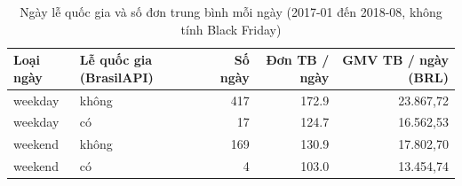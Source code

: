 \begin{table}[htbp]\centering\scriptsize\caption{Ngày lễ quốc gia và số đơn trung bình mỗi ngày (2017-01 đến 2018-08, không tính Black Friday)}\label{tab:api-holiday}
\begin{tabular}{llrrr}\toprule
\textbf{Loại ngày} & \textbf{Lễ quốc gia (BrasilAPI)} & \textbf{Số ngày} & \textbf{Đơn TB / ngày} & \textbf{GMV TB / ngày (BRL)} \\\midrule
weekday & không & 417 & 172.9 & 23.867,72 \\
weekday & có & 17 & 124.7 & 16.562,53 \\
weekend & không & 169 & 130.9 & 17.802,70 \\
weekend & có & 4 & 103.0 & 13.454,74 \\
\bottomrule\end{tabular}
\end{table}
